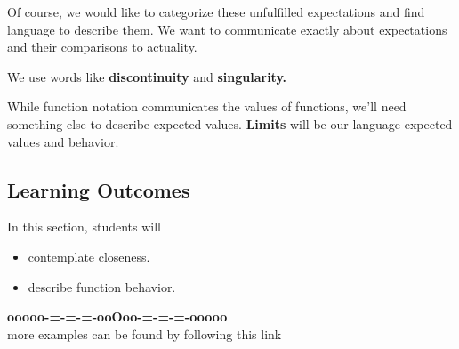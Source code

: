 \documentclass{ximera}
\begin{document}
Of course, we would like to categorize these unfulfilled expectations and find language to describe them. We want to communicate exactly about expectations and their comparisons to actuality. 


We use words like \textbf{\textcolor{purple!85!blue}{discontinuity}} and \textbf{\textcolor{purple!85!blue}{singularity.}} 


While function notation communicates the values of functions, we'll need something else to describe expected values. \textbf{\textcolor{purple!85!blue}{Limits}} will be our language expected values and behavior.





\subsection*{Learning Outcomes}


\begin{sectionOutcomes}
In this section, students will 

\begin{itemize}
\item contemplate closeness.
\item describe function behavior.
\end{itemize}
\end{sectionOutcomes}















\begin{center}
\textbf{\textcolor{green!50!black}{ooooo-=-=-=-ooOoo-=-=-=-ooooo}} \\

more examples can be found by following this link\\ 

\end{center}
\end{document}
